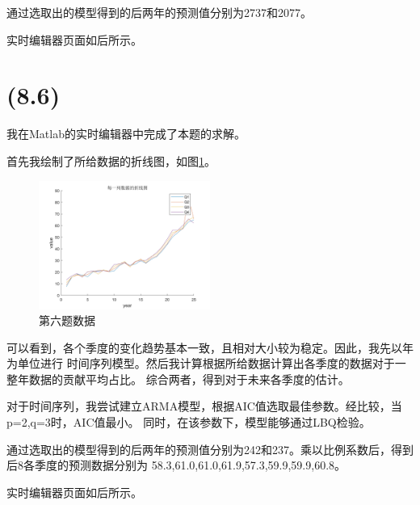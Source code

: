 \documentclass[a4paper]{article}
\begin{document}
通过选取出的模型得到的后两年的预测值分别为2737和2077。

实时编辑器页面如后所示。
\newpage
\section{(8.6)}
我在Matlab的实时编辑器中完成了本题的求解。

首先我绘制了所给数据的折线图，如图\ref{q6}。


\begin{figure}[!h]
    \centering
    \includegraphics*[width = 0.5\textwidth]{q6.jpg}
    \caption{第六题数据}\label{q6}
\end{figure}

可以看到，各个季度的变化趋势基本一致，且相对大小较为稳定。因此，我先以年为单位进行
时间序列模型。然后我计算根据所给数据计算出各季度的数据对于一整年数据的贡献平均占比。
综合两者，得到对于未来各季度的估计。

对于时间序列，我尝试建立ARMA模型，根据AIC值选取最佳参数。经比较，当p=2,q=3时，AIC值最小。
同时，在该参数下，模型能够通过LBQ检验。

通过选取出的模型得到的后两年的预测值分别为242和237。乘以比例系数后，得到后8各季度的预测数据分别为
58.3,61.0,61.0,61.9,57.3,59.9,59.9,60.8。

实时编辑器页面如后所示。
\newpage
\end{document}
